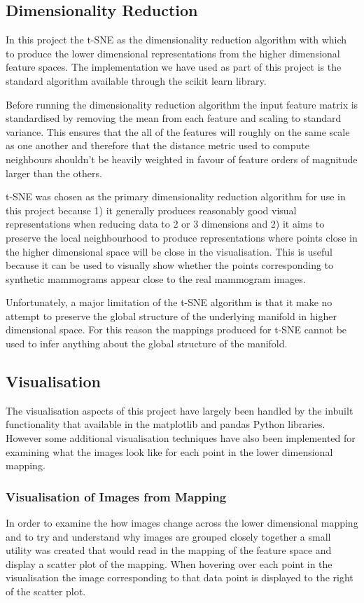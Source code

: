 \subsection{Dimensionality Reduction}
In this project the t-SNE as the dimensionality reduction algorithm with which to produce the lower dimensional representations from the higher dimensional feature spaces. The implementation we have used as part of this project is the standard algorithm available through the scikit learn library. 

Before running the dimensionality reduction algorithm the input feature matrix is standardised by removing the mean from each feature and scaling to standard variance. This ensures that the all of the features will roughly on the same scale as one another and therefore that the distance metric used to compute neighbours shouldn't be heavily weighted in favour of feature orders of magnitude larger than the others.

t-SNE was chosen as the primary dimensionality reduction algorithm for use in this project because 1) it generally produces reasonably good visual representations when reducing data to 2 or 3 dimensions and 2) it aims to preserve the local neighbourhood to produce representations where points close in the higher dimensional space will be close in the visualisation. This is useful because it can be used to visually show whether the points corresponding to synthetic mammograms appear close to the real mammogram images.

Unfortunately, a major limitation of the t-SNE algorithm is that it make no attempt to preserve the global structure of the underlying manifold in higher dimensional space. For this reason the mappings produced for t-SNE cannot be used to infer anything about the global structure of the manifold.

\subsection{Visualisation}
The visualisation aspects of this project have largely been handled by the inbuilt functionality that available in the matplotlib and pandas Python libraries. However some additional visualisation techniques have also been implemented for examining what the images look like for each point in the lower dimensional mapping.

\subsubsection{Visualisation of Images from Mapping}
In order to examine the how images change across the lower dimensional mapping and to try and understand why images are grouped closely together a small utility was created that would read in the mapping of the feature space and display a scatter plot of the mapping. When hovering over each point in the visualisation the image corresponding to that data point is displayed to the right of the scatter plot.

